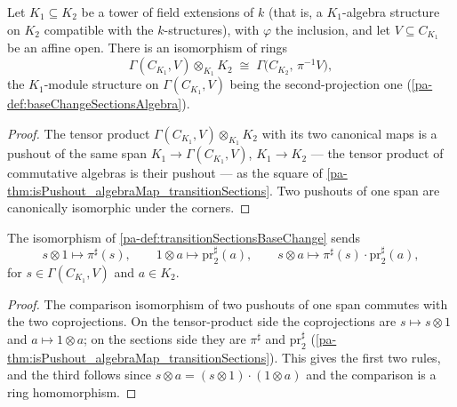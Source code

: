 \begin{definition}
  \label{pa-def:transitionSectionsBaseChange}
  \leanok

  Let \(K_1 \subseteq K_2\) be a tower of field extensions of \(k\) (that is, a
  \(K_1\)-algebra structure on \(K_2\) compatible with the \(k\)-structures), with
  \(\varphi\) the inclusion, and let \(V \subseteq C_{K_1}\) be an affine open. There is
  an isomorphism of rings
  \[
    \Gamma(C_{K_1}, V) \otimes_{K_1} K_2 \;\cong\;
      \Gamma\bigl(C_{K_2},\, \pi^{-1}V\bigr),
  \]
  the \(K_1\)-module structure on \(\Gamma(C_{K_1}, V)\) being the second-projection one
  (\ref{pa-def:baseChangeSectionsAlgebra}).
\end{definition}
\begin{proof}
  \leanok
  The tensor product \(\Gamma(C_{K_1}, V) \otimes_{K_1} K_2\) with its two canonical
  maps is a pushout of the same span \(K_1 \to \Gamma(C_{K_1}, V)\), \(K_1 \to K_2\)
  --- the tensor product of commutative algebras is their pushout --- as the square of
  \ref{pa-thm:isPushout_algebraMap_transitionSections}. Two pushouts of one span are
  canonically isomorphic under the corners.
\end{proof}

\begin{lemma}
  \label{pa-lem:transitionSectionsBaseChange_tmul}
  \leanok

  The isomorphism of \ref{pa-def:transitionSectionsBaseChange} sends
  \[
    s \otimes 1 \longmapsto \pi^{\sharp}(s), \qquad
    1 \otimes a \longmapsto \mathrm{pr}_2^{\sharp}(a), \qquad
    s \otimes a \longmapsto \pi^{\sharp}(s) \cdot \mathrm{pr}_2^{\sharp}(a),
  \]
  for \(s \in \Gamma(C_{K_1}, V)\) and \(a \in K_2\).
\end{lemma}
\begin{proof}
  \leanok
  The comparison isomorphism of two pushouts of one span commutes with the two
  coprojections. On the tensor-product side the coprojections are \(s \mapsto s \otimes
  1\) and \(a \mapsto 1 \otimes a\); on the sections side they are \(\pi^{\sharp}\) and
  \(\mathrm{pr}_2^{\sharp}\) (\ref{pa-thm:isPushout_algebraMap_transitionSections}). This
  gives the first two rules, and the third follows since \(s \otimes a = (s \otimes 1)
  \cdot (1 \otimes a)\) and the comparison is a ring homomorphism.
\end{proof}

